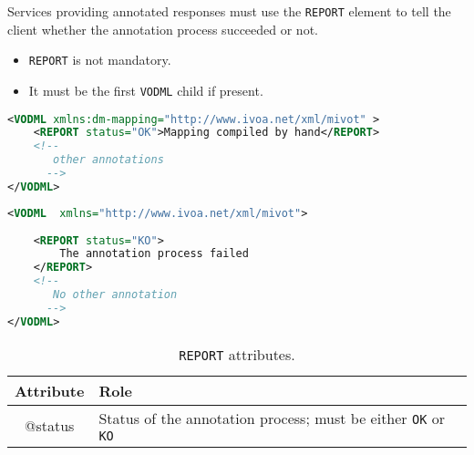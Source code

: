 Services providing annotated responses must use the \texttt{REPORT}  element to tell the client whether the annotation process succeeded or not.

\begin{itemize}
\item \texttt{REPORT} is not mandatory.
\item It must be the first \texttt{VODML} child if present.
\end{itemize}

\begin{lstlisting}[caption={\texttt{REPORT} example for an valid annotation (see in \ref{REPORT_snippet}).},language=XML]
 <VODML xmlns:dm-mapping="http://www.ivoa.net/xml/mivot" >
    <REPORT status="OK">Mapping compiled by hand</REPORT>
	<!-- 
	   other annotations
	  -->	
</VODML>
\end{lstlisting}

\begin{lstlisting}[caption={\texttt{REPORT} example for an annotation failure.},language=XML]
<VODML	xmlns="http://www.ivoa.net/xml/mivot">
	
	<REPORT status="KO">
	    The annotation process failed
	</REPORT>
	<!-- 
	   No other annotation
	  -->	
</VODML>
\end{lstlisting}


\begin{table}[!htbp]
  \small
  \centering
  \begin{tabulary}{\linewidth}{|c|J|}       
    \hline 
         \textbf{Attribute} & 
         \textbf {Role}\\
    \hline
    \hline  
         @status  & 
        Status of the annotation process; must be either \texttt{OK} or \texttt{KO} \\
    \hline 
  \end{tabulary}
  \caption{\texttt{REPORT} attributes.} 
  \label{tbl:report-att}
\end{table}

